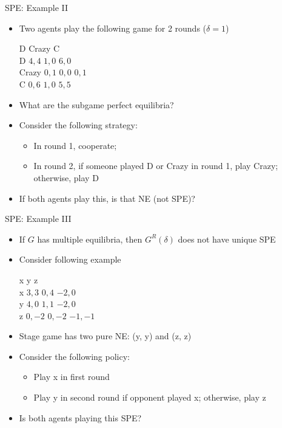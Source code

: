 \documentclass[11pt,aspectratio=169]{beamer}
\begin{document}
  \begin{frame}{SPE: Example II}
   \begin{itemize}[<+->]
    \item Two agents play the following game for 2 rounds ($\delta = 1$)
    \begin{center}
     \hspace{-3.5em}
     \begin{game}{3}{3}
      		\> D			\> Crazy		\> C			\\
      D		\> $4, 4$	\> $1, 0$	\> $6, 0$	\\
      Crazy	\> $0, 1$	\> $0, 0$	\> $0, 1$	\\
      C		\> $0, 6$	\> $1, 0$	\> $5, 5$
     \end{game}
    \end{center}
    \vspace{0.7em}  
    \item What are the subgame perfect equilibria?
    \item Consider the following strategy:
    \begin{itemize}[<.->]
     \item In round 1, cooperate;
     \item In round 2, if someone played D or Crazy in round 1, play Crazy; otherwise, play D
    \end{itemize}
    \item If both agents play this, is that NE (not SPE)?
   \end{itemize}
  \end{frame} 
  
  
  \begin{frame}{SPE: Example III}
   \begin{itemize}
    \item  If $G$ has multiple equilibria, then $G^{R}(\delta)$ does not have unique SPE
    \item Consider following example
    \begin{center}
     \hspace{-3.5em}
     \begin{game}{3}{3}
      	\> x			\> y			\> z			\\
      x	\> $3, 3$	\> $0, 4$	\> $-2, 0$	\\
      y	\> $4, 0$	\> $1, 1$	\> $-2, 0$	\\
      z	\> $0, -2$	\> $0, -2$	\> $-1, -1$
     \end{game}
    \end{center}
    \vspace{0.7em}
    \item Stage game has two pure NE: (y, y) and (z, z)
    \item Consider the following policy:
    \begin{itemize}
     \item Play x in first round
     \item Play y in second round if opponent played x; otherwise, play z
    \end{itemize}
    \item Is both agents playing this SPE?
   \end{itemize}  
  \end{frame}
\end{document}
